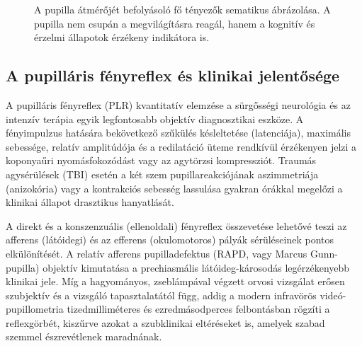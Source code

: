 \documentclass[12pt,a4paper,oneside]{book}
\begin{document}
\begin{figure}[H]
    \centering
    \caption{A pupilla átmérőjét befolyásoló fő tényezők sematikus ábrázolása. A pupilla nem csupán a megvilágításra reagál, hanem a kognitív és érzelmi állapotok érzékeny indikátora is.}
    \label{fig:pupil_factors}
\end{figure}

\subsection{A pupilláris fényreflex és klinikai jelentősége}

A pupilláris fényreflex (PLR) kvantitatív elemzése a sürgősségi neurológia és az intenzív terápia egyik legfontosabb objektív diagnosztikai eszköze. A fényimpulzus hatására bekövetkező szűkülés késleltetése (latenciája), maximális sebessége, relatív amplitúdója és a redilatáció üteme rendkívül érzékenyen jelzi a koponyaűri nyomásfokozódást vagy az agytörzsi kompressziót. Traumás agysérülések (TBI) esetén a két szem pupillareakciójának aszimmetriája (anizokória) vagy a kontrakciós sebesség lassulása gyakran órákkal megelőzi a klinikai állapot drasztikus hanyatlását.

A direkt és a konszenzuális (ellenoldali) fényreflex összevetése lehetővé teszi az afferens (látóidegi) és az efferens (okulomotoros) pályák sérüléseinek pontos elkülönítését. A relatív afferens pupilladefektus (RAPD, vagy Marcus Gunn-pupilla) objektív kimutatása a prechiasmális látóideg-károsodás legérzékenyebb klinikai jele. Míg a hagyományos, zseblámpával végzett orvosi vizsgálat erősen szubjektív és a vizsgáló tapasztalatától függ, addig a modern infravörös videó-pupillometria tizedmilliméteres és ezredmásodperces felbontásban rögzíti a reflexgörbét, kiszűrve azokat a szubklinikai eltéréseket is, amelyek szabad szemmel észrevétlenek maradnának.
\end{document}
